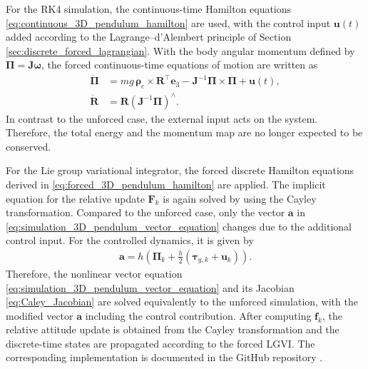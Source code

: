 For the RK4 simulation, the continuous-time Hamilton equations \eqref{eq:continuous_3D_pendulum_hamilton} are used, 
with the control input $\bm{u}(t)$ added according to the Lagrange--d'Alembert principle of Section \ref{sec:discrete_forced_lagrangian}.
With the body angular momentum defined by $\bm{\Pi} = \bm{J}\bm{\omega}$,
the forced continuous-time equations of motion are written as
\begin{subequations}
\label{eq:controlled_3d_pendulum_continuous_RK4}
\begin{align}
    \dot{\bm{\Pi}}
    &=
    mg\,\bm{\rho}_c
    \times
    \bm{R}^{\top}\bm{e}_3
    -
    \bm{J}^{-1}\bm{\Pi}
    \times
    \bm{\Pi}
    +
    \bm{u}(t),
    \label{eq:controlled_3d_pendulum_continuous_momentum}
    \\
    \dot{\bm{R}}
    &=
    \bm{R}
    \left(
        \bm{J}^{-1}\bm{\Pi}
    \right)^{\wedge}.
    \label{eq:controlled_3d_pendulum_continuous_kinematics}
\end{align}
\end{subequations}
In contrast to the unforced case, the external input acts on the system.
Therefore, the total energy and the momentum map are no longer expected to be
conserved.

For the Lie group variational integrator, the forced discrete Hamilton equations
derived in \eqref{eq:forced_3D_pendulum_hamilton} are applied. The implicit
equation for the relative update $\bm{F}_k$ is again solved by using the Cayley
transformation. Compared to the unforced case, only the vector
$\bm{a}$ in \eqref{eq:simulation_3D_pendulum_vector_equation} changes due to
the additional control input. For the controlled dynamics, it is given by
\begin{align}
    \label{eq:controlled_3d_pendulum_cayley_a}
    \bm{a}
    =
    h
    \left(
        \bm{\Pi}_k
        +
        \frac{h}{2}
        \left(
            \bm{\tau}_{g,k}+\bm{u}_k
        \right)
    \right).
\end{align}
Therefore, the nonlinear vector equation \eqref{eq:simulation_3D_pendulum_vector_equation}
and its Jacobian \eqref{eq:Caley_Jacobian} are solved equivalently to the unforced simulation, with
the modified vector $\bm{a}$ including the control contribution. After computing
$\bm{f}_k$, the relative attitude update is obtained from the Cayley transformation
and the discrete-time states are propagated according to the forced LGVI. The corresponding implementation
is documented in the GitHub repository \cite{Elshani2026CTO_GitHub}.

